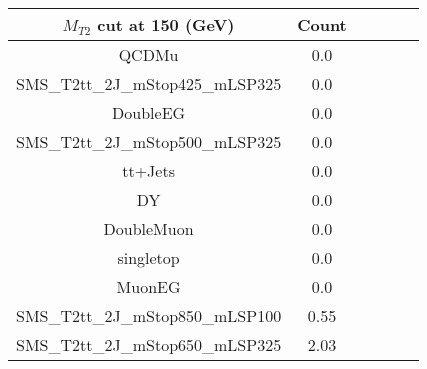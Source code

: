 \documentclass[8pt]{article}
\begin{document}
\begin{tabular}{|c|c|c|c|c|c|}
\hline
$M_{T2}$ cut at 150 (GeV) & Count \\
\hline
\hline
QCDMu & 0.0\\
SMS\_T2tt\_2J\_mStop425\_mLSP325 & 0.0\\
DoubleEG & 0.0\\
SMS\_T2tt\_2J\_mStop500\_mLSP325 & 0.0\\
tt+Jets & 0.0\\
DY & 0.0\\
DoubleMuon & 0.0\\
singletop & 0.0\\
MuonEG & 0.0\\
SMS\_T2tt\_2J\_mStop850\_mLSP100 & 0.55\\
SMS\_T2tt\_2J\_mStop650\_mLSP325 & 2.03\\
\hline
\hline
\end{tabular}
\end{document}
